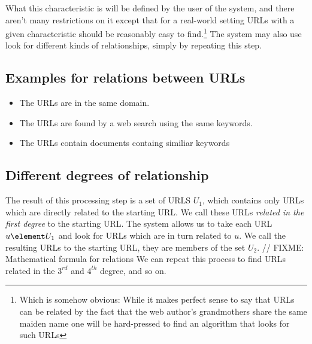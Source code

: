 \documentclass[a4paper]{danarticle}
\begin{document}
{     What this characteristic is will be defined by the user of the
     system, and there aren't many restrictions on it except that
     for a real-world setting URLs with a given characteristic
     should be reasonably easy to find.\footnote{Which is somehow
     obvious: While it makes perfect sense to say that URLs can
     be related by the fact that the web author's grandmothers share
     the same maiden name one will be hard-pressed to find an
     algorithm that looks for such URLs} The system may also
     use look for different kinds of relationships, simply by
     repeating this step.
     
     \subsection*{Examples for relations between URLs}
       \begin{itemize}
         \item{The URLs are in the same domain.}
         \item{The URLs are found by a web search using the same keywords.}
         \item{The URLs contain documents containg similiar keywords}
       \end{itemize}
     
     \subsection*{Different degrees of relationship}
       The result of this processing step is a set of URLS $ U_{1} $,
       which contains only URLs which are directly related to
       the starting URL. We call these URLs \textit{related in the
       first degree} to the starting URL. The system allows us to
       take each URL $ u \element U_{1} $ and look for URLs which
       are in turn related to $ u $. We call the resulting URLs
        to the starting URL,
       they are members of the set $ U_{2} $.
       // FIXME: Mathematical formula for relations
       We can repeat this process to find URLs related in the 
       $ 3^{rd} $ and $ 4^{th} $ degree, and so on.
       
}
\end{document}
